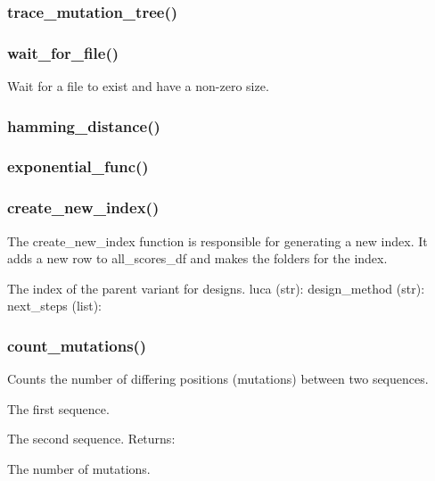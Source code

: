 \documentclass[10pt]{extarticle}
\begin{document}
\subsubsection{trace\_mutation\_tree()}
\subsubsection{wait\_for\_file()}
Wait for a file to exist and have a non-zero size.
\subsubsection{hamming\_distance()}
\subsubsection{exponential\_func()}
\subsubsection{create\_new\_index()}
The create\_new\_index function is responsible for generating a new index.
It adds a new row to all\_scores\_df and makes the folders for the index.

\par\vspace*{0.5\baselineskip}
{
\begin{description}[noitemsep,topsep=0pt,parsep=0pt,labelwidth=5cm,leftmargin=!,labelindent=0pt,labelsep=0.2cm,itemsep=0pt]
\item[\textcolor{mpgAccentBlue!75!white}{parent\_index (str)\dotfill}] The index of the parent variant for designs. luca (str): design\_method (str): next\_steps (list):
\end{description}
}
\subsubsection{count\_mutations()}
Counts the number of differing positions (mutations) between two sequences.

\par\vspace*{0.5\baselineskip}
{
\begin{description}[noitemsep,topsep=0pt,parsep=0pt,labelwidth=5cm,leftmargin=!,labelindent=0pt,labelsep=0.2cm,itemsep=0pt]
\item[\textcolor{mpgAccentBlue!75!white}{seq1 (str)\dotfill}] The first sequence.
\item[\textcolor{mpgAccentBlue!75!white}{seq2 (str)\dotfill}] The second sequence. Returns:
\item[\textcolor{mpgAccentBlue!75!white}{int\dotfill}] The number of mutations.
\end{description}
}
\end{document}
